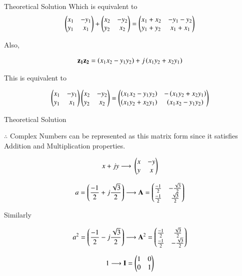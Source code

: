 \documentclass{beamer}
\begin{document}
\begin{frame}{Theoretical Solution}
Which is equivalent to 
\begin{align}
    \begin{pmatrix}x_1 & -y_1 \\ y_1 & x_1 \end{pmatrix} + \begin{pmatrix}x_2 & -y_2 \\ y_2 & x_2 \end{pmatrix} = \begin{pmatrix}x_1+x_2 & -y_1-y_2 \\ y_1+y_2 & x_1+x_1\end{pmatrix}
\end{align}

Also, 

\begin{align}
    \mathbf{z_1}\mathbf{z_2} = \left(x_1x_2 - y_1y_2\right) + j\left(x_1y_2 + x_2y_1\right)
\end{align}

This is equivalent to 

\begin{align}
    \begin{pmatrix}x_1 & -y_1 \\ y_1 & x_1\end{pmatrix}\begin{pmatrix}x_2 & -y_2 \\ y_2 & x_2 \end{pmatrix} = \begin{pmatrix}\left(x_1x_2 - y_1y_2\right) & -\left(x_1y_2 + x_2y_1\right) \\ \left(x_1y_2 + x_2y_1\right) & \left(x_1x_2 - y_1y_2\right)\end{pmatrix}
\end{align}
 
\end{frame}

\begin{frame}{Theoretical Solution}

$\therefore$ Complex Numbers can be represented as this matrix form since it satisfies Addition and Multiplication properties. 
 
\begin{align}
    x+jy \longrightarrow{} \begin{pmatrix}x & -y \\ y & x \end{pmatrix}
\end{align}

\begin{align}
    a = \left(\frac{-1}{2} + j\frac{\sqrt{3}}{2}\right) \longrightarrow \mathbf{A} = \begin{pmatrix}\frac{-1}{2}&-\frac{\sqrt{3}}{2}\\\frac{-1}{2} & \frac{\sqrt{3}}{2}\end{pmatrix}
\end{align}

Similarly 

\begin{align}
    a^2 = \left(\frac{-1}{2} - j\frac{\sqrt{3}}{2}\right) \longrightarrow \mathbf{A}^2 = \begin{pmatrix}\frac{-1}{2}&\frac{\sqrt{3}}{2}\\\frac{-1}{2} & -\frac{\sqrt{3}}{2}\end{pmatrix}
\end{align}

\begin{align}
    1 \longrightarrow \mathbf{I} = \begin{pmatrix}1&0\\0&1\end{pmatrix}
\end{align}
\end{frame}
\end{document}
